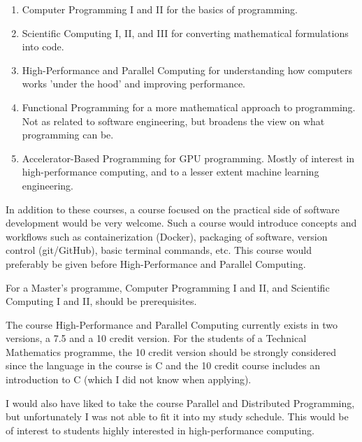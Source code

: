 \documentclass{article}
\begin{document}
  \begin{enumerate}
    \item Computer Programming I and II for the basics of programming.
    \item Scientific Computing I, II, and III for converting mathematical formulations into code.
    \item High-Performance and Parallel Computing for understanding how computers works 'under the hood' and improving performance.
    \item Functional Programming for a more mathematical approach to programming. Not as related to software engineering, but broadens the view on what programming can be.
    \item Accelerator-Based Programming for GPU programming. Mostly of interest in high-performance computing, and to a lesser extent machine learning engineering.
  \end{enumerate}

  In addition to these courses, a course focused on the practical side of software development would be very welcome.
  Such a course would introduce concepts and workflows such as containerization (Docker), packaging of software, version control (git/GitHub), basic terminal commands, etc.
  This course would preferably be given before High-Performance and Parallel Computing.

  For a Master's programme, Computer Programming I and II, and Scientific Computing I and II, should be prerequisites.

  The course High-Performance and Parallel Computing currently exists in two versions, a 7.5 and a 10 credit version.
  For the students of a Technical Mathematics programme, the 10 credit version should be strongly considered since the language in the course is C and the 10 credit course includes an introduction to C (which I did not know when applying).

  I would also have liked to take the course Parallel and Distributed Programming, but unfortunately I was not able to fit it into my study schedule.
  This would be of interest to students highly interested in high-performance computing.
\end{document}
